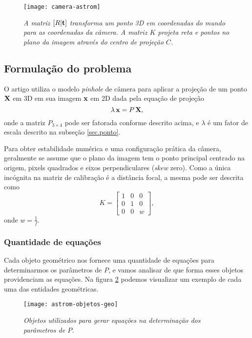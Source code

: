 \begin{figure}[!htb]
\centering
\texttt{[image: camera-astrom]}
\caption{{\it A matriz $[R|{\bf t}]$ transforma um ponto 3D em coordenadas do mundo para as coordenadas da câmera. A matriz $K$ projeta reta e pontos no plano da imagem através do centro de projeção $C$.}}
\label{fig.camera-astrom}
\end{figure}

\subsection{Formulação do problema}

O artigo utiliza o modelo {\it pinhole} de câmera para aplicar a projeção de um ponto $\mathbf{X}$ em 3D em sua imagem $\mathbf{x}$ em 2D dada pela equação de projeção
\begin{equation}\label{eq.projecao}
\lambda\,\mathbf{x}=P\,\mathbf{X},
\end{equation}
onde a matriz $P_{3\times4}$ pode ser fatorada conforme descrito acima, e $\lambda$ é um fator de escala descrito na subseção \ref{sec.ponto}. 

Para obter estabilidade numérica e uma configuração prática da câmera, geralmente se assume que o plano da imagem tem o ponto principal centrado na origem, pixels quadrados e eixos perpendiculares ({\it skew} zero). Como a única incógnita na matriz de calibração é a distância focal, a mesma pode ser descrita como
\begin{equation}\label{eq.astrom-K}
K=
\begin{bmatrix}
1&0&0\\
0&1&0\\
0&0&w
\end{bmatrix},
\end{equation}
onde $w=\frac{1}{f}$.

\subsubsection*{Quantidade de equações}

Cada objeto geométrico nos fornece uma quantidade de equações para determinarmos os parâmetros de $P$, e vamos analisar de que forma esses objetos providenciam as equações. Na figura \ref{fig.astrom-objetos-geo} podemos visualizar um exemplo de cada uma das entidades geométricas.

\begin{figure}[!htb]
\centering
\texttt{[image: astrom-objetos-geo]}
\caption{{\it Objetos utilizados para gerar equações na determinação dos parâmetros de $P$.}}
\label{fig.astrom-objetos-geo}
\end{figure}

